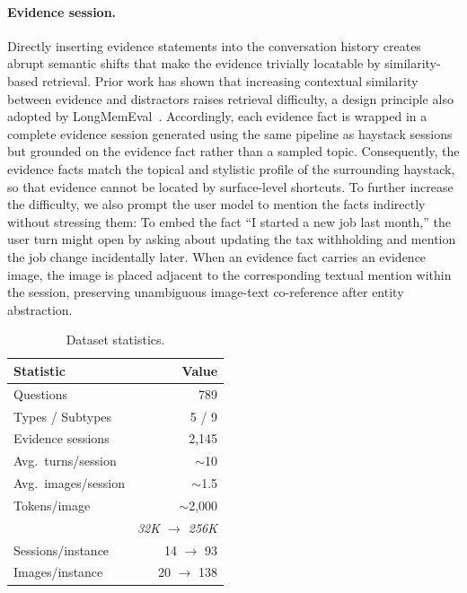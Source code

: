 \documentclass{article}
\begin{document}
\paragraph{Evidence session.}
Directly inserting evidence statements into the conversation history creates abrupt semantic shifts that make the evidence trivially locatable by similarity-based retrieval. Prior work has shown that increasing contextual similarity between evidence and distractors raises retrieval difficulty, a design principle also adopted by LongMemEval~\cite{wu2025longmemevalbenchmarkingchatassistants}. Accordingly, each evidence fact is wrapped in a complete evidence session generated using the same pipeline as haystack sessions but grounded on the evidence fact rather than a sampled topic. Consequently, the evidence facts match the topical and stylistic profile of the surrounding haystack, so that evidence cannot be located by surface-level shortcuts. To further increase the difficulty, we also prompt the user model to mention the facts indirectly without stressing them: To embed the fact “I started a new job last month,” the user turn might open by asking about updating the tax withholding and mention the job change incidentally later. When an evidence fact carries an evidence image, the image is placed adjacent to the corresponding textual mention within the session, preserving unambiguous image-text co-reference after entity abstraction.

\begin{table}
  \centering
  \vspace{-12pt}
  \caption{\small Dataset statistics.}
  \label{tab:dataset_stats}
  \small
  \begin{tabular}{@{}lr@{}}
  \toprule
  \textbf{Statistic} & \textbf{Value} \\
  \midrule
  Questions           & 789 \\
  Types / Subtypes    & 5 / 9 \\
  Evidence sessions   & 2{,}145 \\
  Avg.\ turns/session & $\sim$10 \\
  Avg.\ images/session & $\sim$1.5 \\
  Tokens/image        & $\sim$2{,}000 \\
  \midrule
                      & \footnotesize\textit{32K $\to$ 256K} \\
  Sessions/instance   & 14 $\to$ 93 \\
  Images/instance     & 20 $\to$ 138 \\
  \bottomrule
  \end{tabular}
  \vspace{-8pt}
\end{table}
\end{document}
